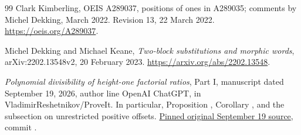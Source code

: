\documentclass[11pt]{article}
\begin{document}
\begin{thebibliography}{99}
Clark Kimberling, OEIS A289037, positions of ones in A289035;
comments by Michel Dekking, March 2022.
Revision 13, 22 March 2022.
\url{https://oeis.org/A289037}.

Michel Dekking and Michael Keane,
\emph{Two-block substitutions and morphic words},
arXiv:2202.13548v2, 20 February 2023.
\url{https://arxiv.org/abs/2202.13548}.

\emph{Polynomial divisibility of height-one factorial ratios},
Part I, manuscript dated September 19, 2026, author line OpenAI ChatGPT,
in VladimirReshetnikov/ProveIt.  In particular, Proposition
, Corollary , and the
subsection on unrestricted positive offsets.
\href{https://github.com/VladimirReshetnikov/ProveIt/blob/a3fe9660ee6c3ab92752594c2099c3cd214012c9/docs/reports/congruences-and-valuations/factorial-ratio-polynomial-divisibility/article.tex}{Pinned original September 19 source},
commit .
\end{thebibliography}
\end{document}
